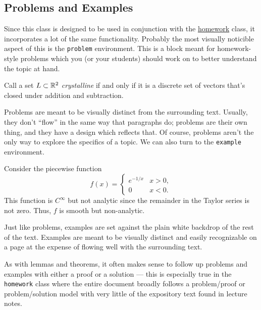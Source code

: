\documentclass{notes}
\begin{document}
	\subsection{Problems and Examples}
	Since this class is designed to be used in conjunction with the \href{https://www.github.com/jopetty/homework}{homework} class, it incorporates a lot of the same functionality.
	Probably the most visually noticible aspect of this is the \texttt{problem} environment.
	This is a block meant for homework-style problems which you (or your students) should work on to better understand the topic at hand.
	\begin{problem}
		Call a set $L \subset \mathbb{R}^2$ \emph{crystalline} if and only if it is a discrete set of vectors that's closed under addition and subtraction.
	\end{problem}
	Problems are meant to be visually distinct from the surrounding text. Usually, they don't ``flow'' in the same way that paragraphs do; problems are their own thing, and they have a design which reflects that. Of course, problems aren't the only way to explore the specifics of a topic. We can also turn to the \texttt{example} environment.
	\begin{example}
		Consider the piecewise function 
		\[ f(x) = \begin{cases} e^{-1/x} & x > 0, \\ 0 & x < 0. \end{cases} \]
		This function is $C^\infty$ but not analytic since the remainder in the Taylor series is not zero. Thus, $f$ is smooth but non-analytic.
	\end{example}
	Just like problems, examples are set against the plain white backdrop of the rest of the text.
	Examples are meant to be visually distinct and easily recognizable on a page at the expense of flowing well with the surrounding text.

	As with lemmas and theorems, it often makes sense to follow up problems and examples with either a proof or a solution --- this is especially true in the \texttt{homework} class where the entire document broadly follows a problem/proof or problem/solution model with very little of the expository text found in lecture notes. 
\end{document}
